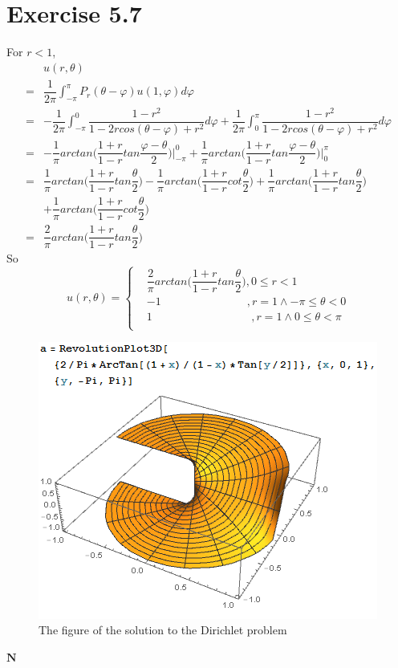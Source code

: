 \documentclass[a4paper,12pt,titlepage]{article}
\begin{document}
\section*{Exercise 5.7}
For $r<1$,
\begin{align*}
&u(r,\theta)\\
=&\dfrac{1}{2\pi}\int_{-\pi}^{\pi}P_r(\theta-\varphi)u(1,\varphi)d\varphi\\
=&-\dfrac{1}{2\pi}\int_{-\pi}^{0}\dfrac{1-r^2}{1-2rcos(\theta-\varphi)+r^2}d\varphi+\dfrac{1}{2\pi}\int_{0}^{\pi}\dfrac{1-r^2}{1-2rcos(\theta-\varphi)+r^2}d\varphi\\
=&-\dfrac{1}{\pi}arctan\Big(\dfrac{1+r}{1-r}tan\dfrac{\varphi-\theta}{2}\Big)\Big|^0_{-\pi}+\dfrac{1}{\pi}arctan\Big(\dfrac{1+r}{1-r}tan\dfrac{\varphi-\theta}{2}\Big)\Big|_0^{\pi}\\
=&\dfrac{1}{\pi}arctan\Big(\dfrac{1+r}{1-r}tan\dfrac{\theta}{2}\Big)-\dfrac{1}{\pi}arctan\Big(\dfrac{1+r}{1-r}cot\dfrac{\theta}{2}\Big)+\dfrac{1}{\pi}arctan\Big(\dfrac{1+r}{1-r}tan\dfrac{\theta}{2}\Big)\\
&+\dfrac{1}{\pi}arctan\Big(\dfrac{1+r}{1-r}cot\dfrac{\theta}{2}\Big)\\
=&\dfrac{2}{\pi}arctan\Big(\dfrac{1+r}{1-r}tan\dfrac{\theta}{2}\Big)
\end{align*}
So
$$u(r,\theta)=\left\{
\begin{aligned}
&\dfrac{2}{\pi}arctan\Big(\dfrac{1+r}{1-r}tan\dfrac{\theta}{2}\Big),0\leqslant r<1\\
&-1\,\,\,\,\,\,\,\,\,\,\,\,\,\,\,\,\,\,\,\,\,\,\,\,\,\,\,\,\,\,\,\,\,\,\,\,\,\,\,\,\,\,\,\,\,\,,r=1\wedge -\pi\leqslant\theta<0\\
&1\,\,\,\,\,\,\,\,\,\,\,\,\,\,\,\,\,\,\,\,\,\,\,\,\,\,\,\,\,\,\,\,\,\,\,\,\,\,\,\,\,\,\,\,\,\,\,\,\,\,\,\,\,,r=1\wedge 0\leqslant\theta<\pi\\
\end{aligned}
\right.
$$
\begin{figure}[H]
    \centering
    \includegraphics[scale=1]{1.png}
    \caption{The figure of the solution to the Dirichlet problem}

\end{figure}



$\mathbf{N}$
\end{document}
